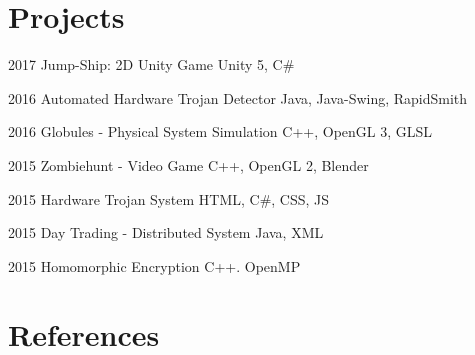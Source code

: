 \documentclass{tccv}
\begin{document}
\section{Projects}

\begin{yearlist}
\item{2017}
{Jump-Ship: 2D Unity Game}
{Unity 5, C\#}

\item{2016}
{Automated Hardware Trojan Detector}
{Java, Java-Swing, RapidSmith}
	
\item{2016}
{Globules - Physical System Simulation}
{C++, OpenGL 3, GLSL}

\item{2015}
{Zombiehunt - Video Game}
{C++, OpenGL 2, Blender}

\item{2015}
    {Hardware Trojan System}
	{HTML, C\#, CSS, JS}

\item{2015}
     {Day Trading - Distributed System}
     {Java, XML}

\item{2015}
     {Homomorphic Encryption}
     {C++. OpenMP}


\end{yearlist}



%
%
%
%

\section{References}
\end{document}

